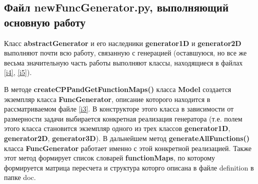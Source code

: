 \documentclass[a4paper]{article}
\begin{document}
\subsection{\Large Файл newFuncGenerator.py, выполняющий основную работу}
Класс {\bf abstractGenerator} и его наследники {\bf generator1D} и {\bf generator2D} выполняют почти всю работу, связанную с генерацией (остав\-шу\-ю\-ся, но все же весьма значительную часть работы выполняют классы, на\-хо\-дя\-щи\-е\-ся в файлах \ref{i4}, \ref{i5}).

В методе {\bf createCPPandGetFunctionMaps()} класса {\bf Model} со\-зда\-ет\-ся экземпляр класса {\bf FuncGenerator}, описание которого находится в рассматриваемом файле \ref{i3}. В конструкторе этого класса в зависимости от размерности задачи выбирается конкретная реализация генератора (т.е. полем этого класса становится экземпляр одного из трех классов {\bf generator1D}, {\bf generator2D}, {\bf generator3D}). В дальнейшем метод {\bf generateAllFunctions()} класса {\bf FuncGenerator} работает именно с этой конкретной реализацией. Также этот метод формирует список словарей {\bf functionMaps}, по которому формируется матрица пересчета и структура которго описана в файле definition в папке doc.
\end{document}
